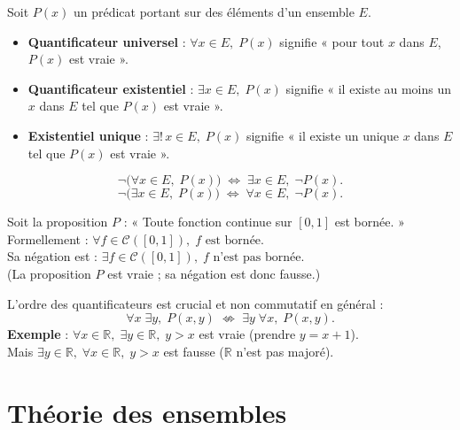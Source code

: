 \documentclass[11pt,a4paper,twoside]{book}
\newcommand{\R}{\mathbb{R}}
\begin{document}
\begin{definitionbox}[Quantificateurs]
Soit $P(x)$ un prédicat portant sur des éléments d'un ensemble $E$.
\begin{itemize}
  \item \textbf{Quantificateur universel} : $\forall x \in E,\; P(x)$ signifie « pour tout
        $x$ dans $E$, $P(x)$ est vraie ».
  \item \textbf{Quantificateur existentiel} : $\exists x \in E,\; P(x)$ signifie « il existe
        au moins un $x$ dans $E$ tel que $P(x)$ est vraie ».
  \item \textbf{Existentiel unique} : $\exists!\, x \in E,\; P(x)$ signifie « il existe un
        unique $x$ dans $E$ tel que $P(x)$ est vraie ».
\end{itemize}
\end{definitionbox}

\begin{propositionbox}
\[
  \neg\bigl(\forall x \in E,\; P(x)\bigr) \;\Leftrightarrow\; \exists x \in E,\; \neg P(x).
\]
\[
  \neg\bigl(\exists x \in E,\; P(x)\bigr) \;\Leftrightarrow\; \forall x \in E,\; \neg P(x).
\]
\end{propositionbox}

\begin{exemplebox}
Soit la proposition $P$ : « Toute fonction continue sur $[0,1]$ est bornée. »\\
Formellement : $\forall f \in \mathcal{C}([0,1]),\; f \text{ est bornée}$.\\
Sa négation est : $\exists f \in \mathcal{C}([0,1]),\; f \text{ n'est pas bornée}$.\\
(La proposition $P$ est vraie ; sa négation est donc fausse.)
\end{exemplebox}

\begin{erreurbox}
L'ordre des quantificateurs est crucial et non commutatif en général :
\[
  \forall x\; \exists y,\; P(x,y) \;\not\Leftrightarrow\; \exists y\; \forall x,\; P(x,y).
\]
\textbf{Exemple} : $\forall x \in \R,\; \exists y \in \R,\; y > x$ est vraie (prendre $y = x+1$).\\
Mais $\exists y \in \R,\; \forall x \in \R,\; y > x$ est fausse ($\R$ n'est pas majoré).
\end{erreurbox}

\section{Théorie des ensembles}
\end{document}
